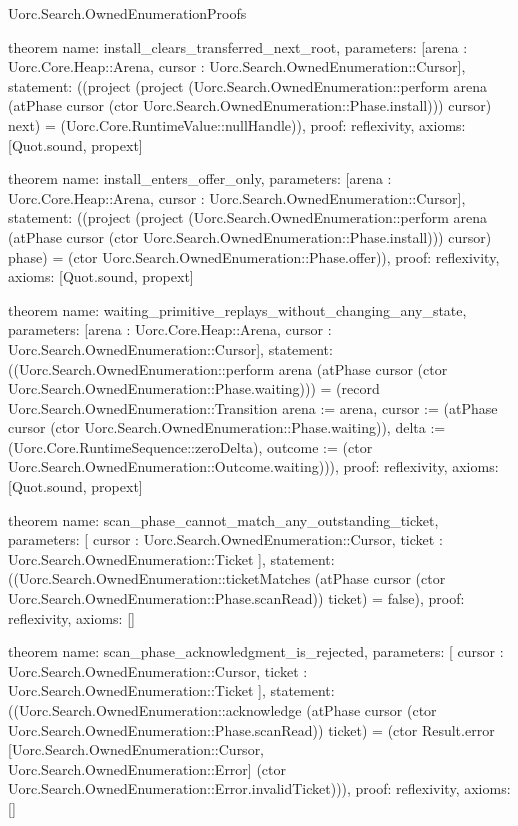 \begin{lexlean}{Uorc.Search.OwnedEnumerationProofs}
\begin{semanticmodule}
theorem{
  name: install_clears_transferred_next_root,
  parameters: [arena : Uorc.Core.Heap::Arena, cursor : Uorc.Search.OwnedEnumeration::Cursor],
  statement: ((project (project (Uorc.Search.OwnedEnumeration::perform arena (atPhase cursor (ctor Uorc.Search.OwnedEnumeration::Phase.install))) cursor) next) = (Uorc.Core.RuntimeValue::nullHandle)),
  proof: reflexivity{},
  axioms: [Quot.sound, propext]
}

theorem{
  name: install_enters_offer_only,
  parameters: [arena : Uorc.Core.Heap::Arena, cursor : Uorc.Search.OwnedEnumeration::Cursor],
  statement: ((project (project (Uorc.Search.OwnedEnumeration::perform arena (atPhase cursor (ctor Uorc.Search.OwnedEnumeration::Phase.install))) cursor) phase) = (ctor Uorc.Search.OwnedEnumeration::Phase.offer)),
  proof: reflexivity{},
  axioms: [Quot.sound, propext]
}

theorem{
  name: waiting_primitive_replays_without_changing_any_state,
  parameters: [arena : Uorc.Core.Heap::Arena, cursor : Uorc.Search.OwnedEnumeration::Cursor],
  statement: ((Uorc.Search.OwnedEnumeration::perform arena (atPhase cursor (ctor Uorc.Search.OwnedEnumeration::Phase.waiting))) = (record Uorc.Search.OwnedEnumeration::Transition {arena := arena, cursor := (atPhase cursor (ctor Uorc.Search.OwnedEnumeration::Phase.waiting)), delta := (Uorc.Core.RuntimeSequence::zeroDelta), outcome := (ctor Uorc.Search.OwnedEnumeration::Outcome.waiting)})),
  proof: reflexivity{},
  axioms: [Quot.sound, propext]
}

theorem{
  name: scan_phase_cannot_match_any_outstanding_ticket,
  parameters: [
    cursor : Uorc.Search.OwnedEnumeration::Cursor,
    ticket : Uorc.Search.OwnedEnumeration::Ticket
  ],
  statement: ((Uorc.Search.OwnedEnumeration::ticketMatches (atPhase cursor (ctor Uorc.Search.OwnedEnumeration::Phase.scanRead)) ticket) = false),
  proof: reflexivity{},
  axioms: []
}

theorem{
  name: scan_phase_acknowledgment_is_rejected,
  parameters: [
    cursor : Uorc.Search.OwnedEnumeration::Cursor,
    ticket : Uorc.Search.OwnedEnumeration::Ticket
  ],
  statement: ((Uorc.Search.OwnedEnumeration::acknowledge (atPhase cursor (ctor Uorc.Search.OwnedEnumeration::Phase.scanRead)) ticket) = (ctor Result.error [Uorc.Search.OwnedEnumeration::Cursor, Uorc.Search.OwnedEnumeration::Error] (ctor Uorc.Search.OwnedEnumeration::Error.invalidTicket))),
  proof: reflexivity{},
  axioms: []
}


\end{semanticmodule}
\end{lexlean}
